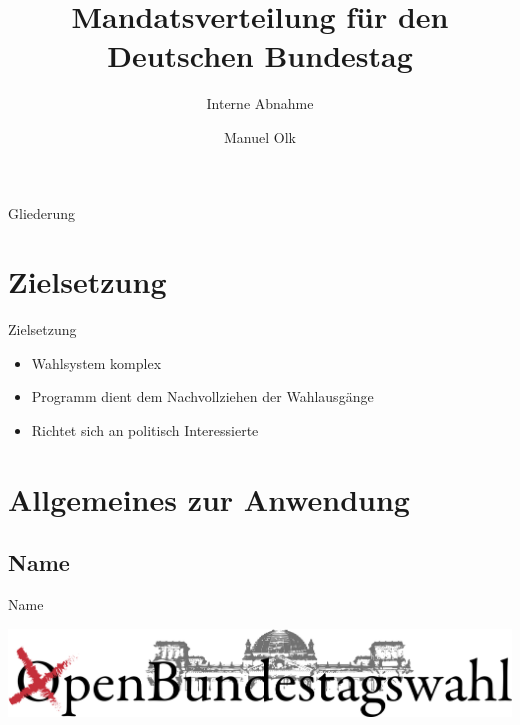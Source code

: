 \documentclass[18pt]{beamer}
\title[Interne Abnahme]{Mandatsverteilung für den Deutschen Bundestag}
\subtitle{Interne Abnahme}
\author{Manuel Olk}
\institute{Praxis der Softwareentwicklung, WS 2013/14}
\begin{document}

\begin{frame}
\titlepage
\end{frame}

\begin{frame}{Gliederung}
\tableofcontents
\end{frame}


\section{Zielsetzung}
\begin{frame}{Zielsetzung}
\begin{itemize}
	\item Wahlsystem komplex
	\item Programm dient dem Nachvollziehen der Wahlausgänge
	\item Richtet sich an politisch Interessierte
\end{itemize}
\end{frame}

\section{Allgemeines zur Anwendung}
\subsection{Name}
\begin{frame}{Name}

\begin{center}
	\includegraphics[scale=0.8]{img/OpenBundestagswahl.png}
\end{center}
\end{frame}
\end{document}
